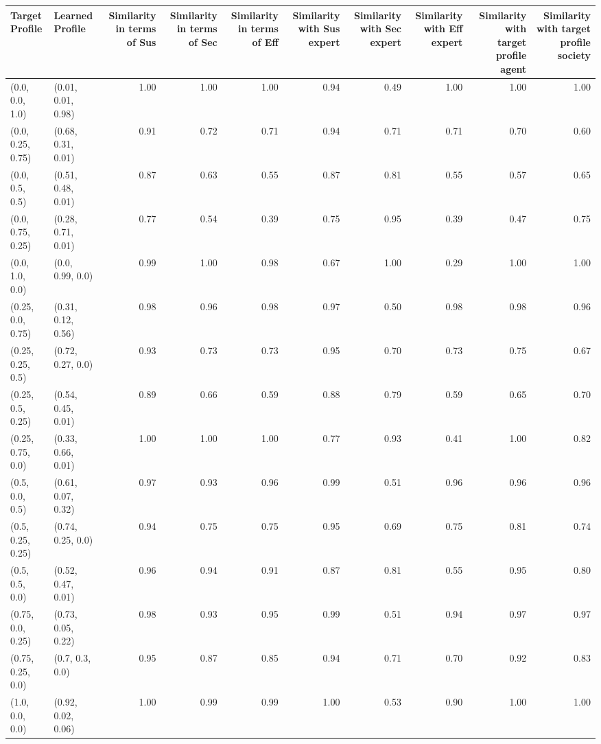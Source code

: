 \begin{tabular}{llrrrrrrrr}
\toprule
Target Profile & Learned Profile & Similarity in terms of Sus & Similarity in terms of Sec & Similarity in terms of Eff & Similarity with Sus expert & Similarity with Sec expert & Similarity with Eff expert & Similarity with target profile agent & Similarity with target profile society \\
\midrule
(0.0, 0.0, 1.0) & (0.01, 0.01, 0.98) & 1.00 & 1.00 & 1.00 & 0.94 & 0.49 & 1.00 & 1.00 & 1.00 \\
(0.0, 0.25, 0.75) & (0.68, 0.31, 0.01) & 0.91 & 0.72 & 0.71 & 0.94 & 0.71 & 0.71 & 0.70 & 0.60 \\
(0.0, 0.5, 0.5) & (0.51, 0.48, 0.01) & 0.87 & 0.63 & 0.55 & 0.87 & 0.81 & 0.55 & 0.57 & 0.65 \\
(0.0, 0.75, 0.25) & (0.28, 0.71, 0.01) & 0.77 & 0.54 & 0.39 & 0.75 & 0.95 & 0.39 & 0.47 & 0.75 \\
(0.0, 1.0, 0.0) & (0.0, 0.99, 0.0) & 0.99 & 1.00 & 0.98 & 0.67 & 1.00 & 0.29 & 1.00 & 1.00 \\
(0.25, 0.0, 0.75) & (0.31, 0.12, 0.56) & 0.98 & 0.96 & 0.98 & 0.97 & 0.50 & 0.98 & 0.98 & 0.96 \\
(0.25, 0.25, 0.5) & (0.72, 0.27, 0.0) & 0.93 & 0.73 & 0.73 & 0.95 & 0.70 & 0.73 & 0.75 & 0.67 \\
(0.25, 0.5, 0.25) & (0.54, 0.45, 0.01) & 0.89 & 0.66 & 0.59 & 0.88 & 0.79 & 0.59 & 0.65 & 0.70 \\
(0.25, 0.75, 0.0) & (0.33, 0.66, 0.01) & 1.00 & 1.00 & 1.00 & 0.77 & 0.93 & 0.41 & 1.00 & 0.82 \\
(0.5, 0.0, 0.5) & (0.61, 0.07, 0.32) & 0.97 & 0.93 & 0.96 & 0.99 & 0.51 & 0.96 & 0.96 & 0.96 \\
(0.5, 0.25, 0.25) & (0.74, 0.25, 0.0) & 0.94 & 0.75 & 0.75 & 0.95 & 0.69 & 0.75 & 0.81 & 0.74 \\
(0.5, 0.5, 0.0) & (0.52, 0.47, 0.01) & 0.96 & 0.94 & 0.91 & 0.87 & 0.81 & 0.55 & 0.95 & 0.80 \\
(0.75, 0.0, 0.25) & (0.73, 0.05, 0.22) & 0.98 & 0.93 & 0.95 & 0.99 & 0.51 & 0.94 & 0.97 & 0.97 \\
(0.75, 0.25, 0.0) & (0.7, 0.3, 0.0) & 0.95 & 0.87 & 0.85 & 0.94 & 0.71 & 0.70 & 0.92 & 0.83 \\
(1.0, 0.0, 0.0) & (0.92, 0.02, 0.06) & 1.00 & 0.99 & 0.99 & 1.00 & 0.53 & 0.90 & 1.00 & 1.00 \\
\bottomrule
\end{tabular}
